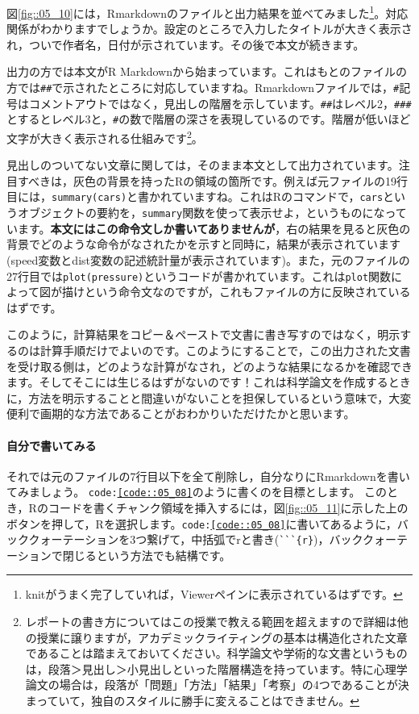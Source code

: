 \documentclass{ltjbook}
\begin{document}
図\ref{fig::05_10}には，Rmarkdownのファイルと出力結果を並べてみました\footnote{knitがうまく完了していれば，Viewerペインに表示されているはずです。}。対応関係がわかりますでしょうか。設定のところで入力したタイトルが大きく表示され，ついで作者名，日付が示されています。その後で本文が続きます。

出力の方では本文がR Markdownから始まっています。これはもとのファイルの方では\verb|##|で示されたところに対応していますね。Rmarkdownファイルでは，\verb|#|記号はコメントアウトではなく，見出しの階層を示しています。\verb|##|はレベル2，\verb|###|とするとレベル3と，\verb|#|の数で階層の深さを表現しているのです。階層が低いほど文字が大きく表示される仕組みです\footnote{レポートの書き方についてはこの授業で教える範囲を超えますので詳細は他の授業に譲りますが，アカデミックライティングの基本は構造化された文章であることは踏まえておいてください。科学論文や学術的な文書というものは，段落＞見出し＞小見出しといった階層構造を持っています。特に心理学論文の場合は，段落が「問題」「方法」「結果」「考察」の4つであることが決まっていて，独自のスタイルに勝手に変えることはできません。}。

見出しのついてない文章に関しては，そのまま本文として出力されています。注目すべきは，灰色の背景を持ったRの領域の箇所です。例えば元ファイルの19行目には，\texttt{summary(cars)}と書かれていますね。これはRのコマンドで，\texttt{cars}というオブジェクトの要約を，\texttt{summary}関数を使って表示せよ，というものになっています。\textbf{本文にはこの命令文しか書いてありませんが}，右の結果を見ると灰色の背景でどのような命令がなされたかを示すと同時に，結果が表示されています(speed変数とdist変数の記述統計量が表示されています)。また，元のファイルの27行目では\texttt{plot(pressure)}というコードが書かれています。これは\texttt{plot}関数によって図が描けという命令文なのですが，これもファイルの方に反映されているはずです。

このように，計算結果をコピー＆ペーストで文書に書き写すのではなく，明示するのは計算手順だけでよいのです。このようにすることで，この出力された文書を受け取る側は，どのような計算がなされ，どのような結果になるかを確認できます。そしてそこには生じるはずがないのです！これは科学論文を作成するときに，方法を明示することと間違いがないことを担保しているという意味で，大変便利で画期的な方法であることがおわかりいただけたかと思います。

\paragraph{自分で書いてみる}
それでは元のファイルの7行目以下を全て削除し，自分なりにRmarkdownを書いてみましょう。
\texttt{code:\ref{code::05_08}}のように書くのを目標とします。
このとき，Rのコードを書くチャンク領域を挿入するには，図\ref{fig::05_11}に示した上のボタンを押して，Rを選択します。\texttt{code:\ref{code::05_08}}に書いてあるように，バッククォーテーションを3つ繋げて，中括弧でrと書き(\verb|```{r}|)，バッククォーテーションで閉じるという方法でも結構です。
\end{document}
